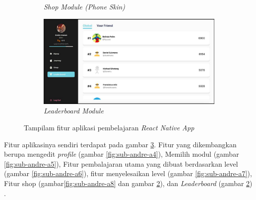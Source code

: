 \begin{figure}[H]
\begin{subfigure}[b]{0.4\textwidth}
		\caption{\textit{Shop Module (Phone Skin)}}
		\label{fig:sub-andre-a9}
	\end{subfigure}
	\hfill
	\begin{subfigure}[b]{0.4\textwidth}
		\centering
		\includegraphics[width=\linewidth]{contents/chapter-2/images/Andre-a10.png}
		\caption{\textit{Leaderboard Module}}
		\label{fig:sub-andre-a10}
	\end{subfigure}
	\caption{Tampilam fitur aplikasi pembelajaran \textit{React Native App}\cite{OctalysisFrameworkAndre}}
	\label{fig:interface fitur pembelajaran React Native}
\end{figure}
Fitur aplikasinya sendiri terdapat pada gambar \ref*{fig:interface fitur pembelajaran React Native}. Fitur yang dikembangkan berupa mengedit \textit{profile} (gambar \ref*{fig:sub-andre-a4}), Memilih modul (gambar \ref*{fig:sub-andre-a5}), Fitur pembalajaran utama yang dibuat berdasarkan level (gambar \ref*{fig:sub-andre-a6}),
fitur menyelesaikan level (gambar \ref*{fig:sub-andre-a7}), Fitur shop (gambar\ref*{fig:sub-andre-a8} dan gambar \ref*{fig:sub-andre-a10}), dan \textit{Leaderboard} (gambar \ref*{fig:sub-andre-a10}) \cite{OctalysisFrameworkAndre}.
